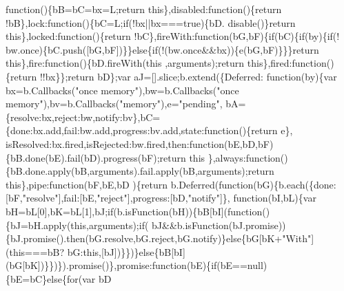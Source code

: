 \begin{DoxyCode}
{      function}()\{bB=bC=bx=L;\textcolor{keywordflow}{return} \textcolor{keyword}{this}\},disabled:\textcolor{keyword}{function}()\{\textcolor{keywordflow}{return} !bB\},lock:\textcolor{keyword}{function}()\{bC=L;\textcolor{keywordflow}{if}(!bx||bx===\textcolor{keyword}{true})\{bD.
      disable()\}\textcolor{keywordflow}{return} \textcolor{keyword}{this}\},locked:\textcolor{keyword}{function}()\{\textcolor{keywordflow}{return} !bC\},fireWith:\textcolor{keyword}{function}(bG,bF)\{\textcolor{keywordflow}{if}(bC)\{\textcolor{keywordflow}{if}(by)\{\textcolor{keywordflow}{if}(!
      bw.once)\{bC.push([bG,bF])\}\}\textcolor{keywordflow}{else}\{\textcolor{keywordflow}{if}(!(bw.once&&bx))\{e(bG,bF)\}\}\}\textcolor{keywordflow}{return} \textcolor{keyword}{this}\},fire:\textcolor{keyword}{function}()\{bD.fireWith(\textcolor{keyword}{this}
      ,arguments);\textcolor{keywordflow}{return} \textcolor{keyword}{this}\},fired:\textcolor{keyword}{function}()\{\textcolor{keywordflow}{return} !!bx\}\};\textcolor{keywordflow}{return} bD\};var aJ=[].slice;b.extend(\{Deferred:\textcolor{keyword}{
      function}(by)\{var bx=b.Callbacks(\textcolor{stringliteral}{"once memory"}),bw=b.Callbacks(\textcolor{stringliteral}{"once memory"}),bv=b.Callbacks(\textcolor{stringliteral}{"memory"}),e=\textcolor{stringliteral}{"pending"},
      bA=\{resolve:bx,reject:bw,notify:bv\},bC=\{done:bx.add,fail:bw.add,progress:bv.add,state:\textcolor{keyword}{function}()\{\textcolor{keywordflow}{return} e\},
      isResolved:bx.fired,isRejected:bw.fired,then:\textcolor{keyword}{function}(bE,bD,bF)\{bB.done(bE).fail(bD).progress(bF);\textcolor{keywordflow}{return} \textcolor{keyword}{this}
      \},always:\textcolor{keyword}{function}()\{bB.done.apply(bB,arguments).fail.apply(bB,arguments);\textcolor{keywordflow}{return} \textcolor{keyword}{this}\},pipe:\textcolor{keyword}{function}(bF,bE,bD
      )\{\textcolor{keywordflow}{return} b.Deferred(\textcolor{keyword}{function}(bG)\{b.each(\{done:[bF,\textcolor{stringliteral}{"resolve"}],fail:[bE,\textcolor{stringliteral}{"reject"}],progress:[bD,\textcolor{stringliteral}{"notify"}]\},\textcolor{keyword}{
      function}(bI,bL)\{var bH=bL[0],bK=bL[1],bJ;\textcolor{keywordflow}{if}(b.isFunction(bH))\{bB[bI](\textcolor{keyword}{function}()\{bJ=bH.apply(\textcolor{keyword}{this},arguments);\textcolor{keywordflow}{if}(
      bJ&&b.isFunction(bJ.promise))\{bJ.promise().then(bG.resolve,bG.reject,bG.notify)\}\textcolor{keywordflow}{else}\{bG[bK+\textcolor{stringliteral}{"With"}](\textcolor{keyword}{this}===bB?
      bG:\textcolor{keyword}{this},[bJ])\}\})\}\textcolor{keywordflow}{else}\{bB[bI](bG[bK])\}\})\}).promise()\},promise:\textcolor{keyword}{function}(bE)\{\textcolor{keywordflow}{if}(bE==null)\{bE=bC\}\textcolor{keywordflow}{else}\{\textcolor{keywordflow}{for}(var bD

\end{DoxyCode}
